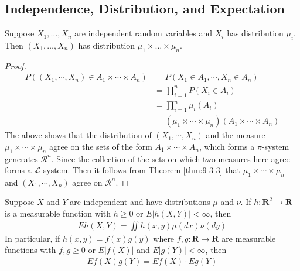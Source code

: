 \documentclass[../main.tex]{subfiles}
\begin{document}
\subsection{Independence, Distribution, and Expectation}

\begin{theorem}{}{}
Suppose $X_1, \dots, X_n$ are independent random variables and $X_i$ has distribution $\mu_i$. Then $(X_1, \dots, X_n)$ has distribution $\mu_1 \times \dots \times \mu_n$.
\end{theorem}
\begin{proof}
     \[
     \begin{aligned}
     P\left( \left(  X_1,\cdots,X_n  \right)\in A_1\times \cdots \times A_{n}  \right)&= P\left( X_1\in A_1,\cdots ,X_{n}\in A_{n} \right)\\ 
      &=    \prod _{i= 1}^{n}P\left( X_{i}\in A_{i} \right)\\ 
       &=  \prod _{i= 1}^{n}\mu _{i}\left( A_{i} \right)\\ 
        &= \left( \mu _1 \times \cdots \times \mu _{n} \right)\left( A_1\times \cdots \times A_{n} \right)    
     \end{aligned}
     \]The above shows that the distribution of \(  (X_1,\cdots ,X_{n})  \) and the measure \(  \mu _1 \times \cdots \times \mu _{n}  \) agree on the sets of the form \(  A_1\times \cdots \times A_{n}  \), which forms a \(   \pi  \)-system  generates \(  \mathcal{R}^{n}  \).   Since the collection of the sets on which two measures here agree forms a \(  \mathcal{L}  \)-system. Then it follows from Theorem \ref{thm:9-3-3} that \(  \mu _1 \times \cdots \times \mu _{n}  \) and \(  \left( X_1,\cdots ,X_{n} \right)   \) agree on \(  \mathcal{R}^{n}  \).      
\end{proof}
\begin{theorem}{}{}
Suppose $X$ and $Y$ are independent and have distributions $\mu$ and $\nu$. If $h : \mathbf{R}^2 \to \mathbf{R}$ is a measurable function with $h \ge 0$ or $E|h(X, Y)| < \infty$, then
\[
\begin{aligned}
Eh(X, Y) = \iint h(x, y) \mu(dx) \nu(dy)
\end{aligned}
\]
In particular, if $h(x, y) = f(x)g(y)$ where $f, g : \mathbf{R} \to \mathbf{R}$ are measurable functions with $f, g \ge 0$ or $E|f(X)|$ and $E|g(Y)| < \infty$, then
\[
\begin{aligned}
Ef(X)g(Y) = Ef(X) \cdot Eg(Y)
\end{aligned}
\]
\end{theorem}
\end{document}
